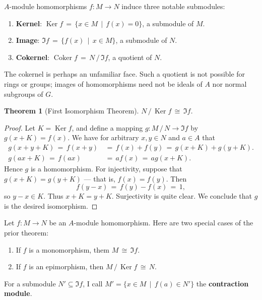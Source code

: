 \documentclass[11pt]{article}
\newtheorem{theorem}{Theorem}
\newcommand{\Ker}{\operatorname{Ker}}
\newcommand{\Coker}{\operatorname{Coker}}
\begin{document}
$A$-module homomorphisms $f : M \to N$ induce three notable submodules: 
\begin{enumerate}
  \item \textbf{Kernel}: $\Ker f \, = \, \{ x \in M \, \mid \, f(x) = 0 \}$, a submodule of $M$.
  \item \textbf{Image}: $\Im f \, = \, \{ f(x) \, \mid \, x \in M \}$, a submodule of $N$.
  \item \textbf{Cokernel}: $\Coker f \, = \, N \, / \, \Im f$, a quotient of $N$.
\end{enumerate}
The cokernel is perhaps an unfamiliar face. Such a quotient is not possible for rings or groups; images of homomorphisms need not be ideals of $A$ nor normal subgroups of $G$. 

\begin{adjustwidth}{0.5cm}{}
  \begin{theorem}[First Isomorphism Theorem]
     $N \, / \, \Ker f \, \cong \, \Im f$.
  \end{theorem}
  \begin{proof}
    Let $K = \Ker f$, and define a mapping $g : M \, / \, N \to \Im f$ by $g(x + K) = f(x)$. We have for arbitrary $x, y \in N$ and $a \in A$ that
    \begin{align*}
      g(x + y + K) \, = \, f(x + y) \, &= \, f(x) + f(y) \, = \, g(x + K) + g(y + K). \\
            g(ax + K) \, = \, f(ax) \, &= \, a f(x) \, = \, a g(x + K).
    \end{align*}
    Hence $g$ is a homomorphism. For injectivity, suppose that $g(x + K) = g(y + K)$ --- that is, $f(x) = f(y)$. Then
    \[
      f(y - x) \, = \, f(y) - f(x) \, = \, 1,
    \]
    so $y - x \in K$. Thus $x + K = y + K$. Surjectivity is quite clear. We conclude that $g$ is the desired isomorphism.
  \end{proof}
\end{adjustwidth}

Let $f : M \to N$ be an $A$-module homomorphism. Here are two special cases of the prior theorem:
\begin{enumerate}
  \item If $f$ is a monomorphism, them $M \, \cong \, \Im f$.
  \item If $f$ is an epimorphism, then $M \, / \, \Ker f \, \cong \, N$.
\end{enumerate}

For a submodule $N' \subseteq \Im f$, I call $M' = \{ x \in M \, \mid \, f(a) \in N' \}$ the \textbf{contraction module}.
\end{document}
